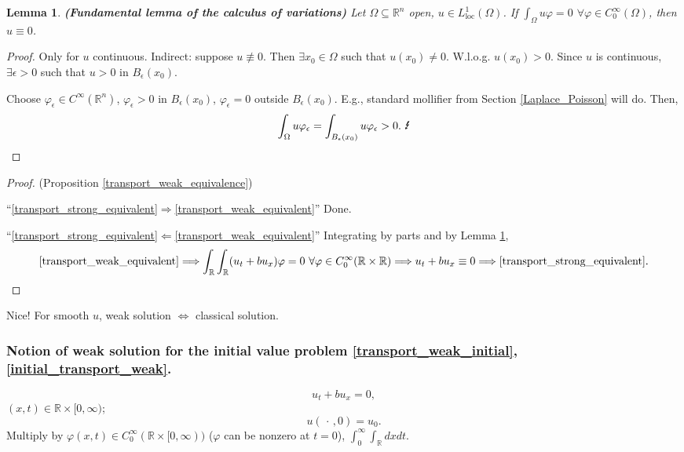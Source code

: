 \documentclass[12pt]{article}
\newtheorem{lemma}{Lemma}[section]
\theoremstyle{definition}
\begin{document}
\begin{lemma}\label{calculus_variations}
\emph{\textbf{(Fundamental lemma of the calculus of variations)}} Let $\Omega\subseteq\mathbb{R}^n$ open, $u\in L_{\text{loc}}^1(\Omega)$. If $\int_{\Omega}u\varphi=0$ $\forall\varphi\in C_0^{\infty}(\Omega)$, then $u\equiv0$.
\end{lemma}

\begin{proof}
Only for $u$ continuous. Indirect: suppose $u\not\equiv0$. Then $\exists x_0\in\Omega$ such that $u(x_0)\neq0$. W.l.o.g. $u(x_0)>0$. Since $u$ is continuous, $\exists\epsilon>0$ such that $u>0$ in $B_{\epsilon}(x_0)$.

Choose $\varphi_{\epsilon}\in C^{\infty}(\mathbb{R}^n)$, $\varphi_{\epsilon}>0$ in $B_{\epsilon}(x_0)$, $\varphi_{\epsilon}=0$ outside $B_{\epsilon}(x_0)$. E.g., standard mollifier from Section \ref{Laplace_Poisson} will do. Then,
\[\int_{\Omega}u\varphi_{\epsilon}=\int_{B_{\epsilon}(x_0)}u\varphi_{\epsilon}>0.\ \text
\Lightning\]
\end{proof}

\begin{proof}
(Proposition \ref{transport_weak_equivalence})

``\ref{transport_strong_equivalent}$\Rightarrow$\ref{transport_weak_equivalent}'' Done.

``\ref{transport_strong_equivalent}$\Leftarrow$\ref{transport_weak_equivalent}'' Integrating by parts and by Lemma \ref{calculus_variations},
\[\text{\ref{transport_weak_equivalent}}\Longrightarrow\int_{\mathbb{R}}\int_{\mathbb{R}}(u_t+bu_x)\varphi=0\ \forall\varphi\in C_0^{\infty}(\mathbb{R}\times\mathbb{R})\Longrightarrow u_t+bu_x\equiv0\Longrightarrow\text{\ref{transport_strong_equivalent}}.\]
\end{proof}

Nice! For smooth $u$, weak solution $\Leftrightarrow$ classical solution.

\subsubsection*{Notion of weak solution for the initial value problem \textbf{\eqref{transport_weak_initial}}, \textbf{\eqref{initial_transport_weak}}.}
\begin{equation}\tag{T}\label{transport_weak_initial}
u_t+bu_x=0,
\end{equation}
$(x,t)\in\mathbb{R}\times[0,\infty)$;
\begin{equation}\tag{IC}\label{initial_transport_weak}
u(\,\cdot\,,0)=u_0.
\end{equation}
Multiply by $\varphi(x,t)\in C_0^{\infty}(\mathbb{R}\times[0,\infty))$ ($\varphi$ can be nonzero at $t=0$), $\int_0^{\infty}\int_{\mathbb{R}}dxdt$.
\end{document}
